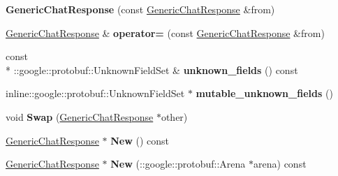 \begin{DoxyCompactItemize}
\item 
\hypertarget{classSimpleChat_1_1GenericChatResponse_a8c213083a5187cc88248f73f4b9caa32}{{\bfseries Generic\-Chat\-Response} (const \hyperlink{classSimpleChat_1_1GenericChatResponse}{Generic\-Chat\-Response} \&from)}\label{classSimpleChat_1_1GenericChatResponse_a8c213083a5187cc88248f73f4b9caa32}

\item 
\hypertarget{classSimpleChat_1_1GenericChatResponse_ab7b303384a8be058542514257b823e7a}{\hyperlink{classSimpleChat_1_1GenericChatResponse}{Generic\-Chat\-Response} \& {\bfseries operator=} (const \hyperlink{classSimpleChat_1_1GenericChatResponse}{Generic\-Chat\-Response} \&from)}\label{classSimpleChat_1_1GenericChatResponse_ab7b303384a8be058542514257b823e7a}

\item 
\hypertarget{classSimpleChat_1_1GenericChatResponse_a6b96bcbb3707721c86be7cd8f0141257}{const \\*
\-::google\-::protobuf\-::\-Unknown\-Field\-Set \& {\bfseries unknown\-\_\-fields} () const }\label{classSimpleChat_1_1GenericChatResponse_a6b96bcbb3707721c86be7cd8f0141257}

\item 
\hypertarget{classSimpleChat_1_1GenericChatResponse_ae9b3f178e2c1977419b592d6e34514fb}{inline\-::google\-::protobuf\-::\-Unknown\-Field\-Set $\ast$ {\bfseries mutable\-\_\-unknown\-\_\-fields} ()}\label{classSimpleChat_1_1GenericChatResponse_ae9b3f178e2c1977419b592d6e34514fb}

\item 
\hypertarget{classSimpleChat_1_1GenericChatResponse_aa5291bf3846f40f0b31b3ed7067e2830}{void {\bfseries Swap} (\hyperlink{classSimpleChat_1_1GenericChatResponse}{Generic\-Chat\-Response} $\ast$other)}\label{classSimpleChat_1_1GenericChatResponse_aa5291bf3846f40f0b31b3ed7067e2830}

\item 
\hypertarget{classSimpleChat_1_1GenericChatResponse_a1a738fd772bbba861c3ba4647d80e71f}{\hyperlink{classSimpleChat_1_1GenericChatResponse}{Generic\-Chat\-Response} $\ast$ {\bfseries New} () const }\label{classSimpleChat_1_1GenericChatResponse_a1a738fd772bbba861c3ba4647d80e71f}

\item 
\hypertarget{classSimpleChat_1_1GenericChatResponse_a02271f6d048eb69dd91bcab14f9139b5}{\hyperlink{classSimpleChat_1_1GenericChatResponse}{Generic\-Chat\-Response} $\ast$ {\bfseries New} (\-::google\-::protobuf\-::\-Arena $\ast$arena) const }\label{classSimpleChat_1_1GenericChatResponse_a02271f6d048eb69dd91bcab14f9139b5}


\end{DoxyCompactItemize}
